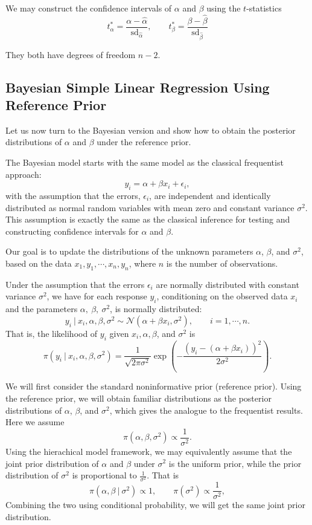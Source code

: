 \documentclass[]{book}
\theoremstyle{definition}
\theoremstyle{definition}
\theoremstyle{definition}
\theoremstyle{remark}
\begin{document}
We may construct the confidence intervals of \(\alpha\) and \(\beta\)
using the \(t\)-statistics \[ 
t_\alpha^\ast = \frac{\alpha - \hat{\alpha}}{\text{sd}_{\hat{\alpha}}},\qquad t_\beta^\ast = \frac{\beta-\hat{\beta}}{\text{sd}_{\hat{\beta}}} 
\]

They both have degrees of freedom \(n-2\).

\subsection{Bayesian Simple Linear Regression Using Reference
Prior}\label{bayesian-simple-linear-regression-using-reference-prior}

Let us now turn to the Bayesian version and show how to obtain the
posterior distributions of \(\alpha\) and \(\beta\) under the reference
prior.

The Bayesian model starts with the same model as the classical
frequentist approach: \[ y_i = \alpha + \beta x_i + \epsilon_i, \] with
the assumption that the errors, \(\epsilon_i\), are independent and
identically distributed as normal random variables with mean zero and
constant variance \(\sigma^2\). This assumption is exactly the same as
the classical inference for testing and constructing confidence
intervals for \(\alpha\) and \(\beta\).

Our goal is to update the distributions of the unknown parameters
\(\alpha\), \(\beta\), and \(\sigma^2\), based on the data
\(x_1, y_1, \cdots, x_n, y_n\), where \(n\) is the number of
observations.

Under the assumption that the errors \(\epsilon_i\) are normally
distributed with constant variance \(\sigma^2\), we have for each
response \(y_i\), conditioning on the observed data \(x_i\) and the
parameters \(\alpha,\ \beta,\ \sigma^2\), is normally distributed:
\[ y_i~|~x_i, \alpha, \beta,\sigma^2 \sim \mathcal{N}(\alpha + \beta x_i, \sigma^2),\qquad i = 1,\cdots, n. \]
That is, the likelihood of \(y_i\) given \(x_i, \alpha, \beta\), and
\(\sigma^2\) is
\[ \pi(y_i~|~x_i, \alpha, \beta, \sigma^2) = \frac{1}{\sqrt{2\pi\sigma^2}}\exp\left(-\frac{(y_i-(\alpha+\beta  x_i))^2}{2\sigma^2}\right). \]

We will first consider the standard noninformative prior (reference
prior). Using the reference prior, we will obtain familiar distributions
as the posterior distributions of \(\alpha\), \(\beta\), and
\(\sigma^2\), which gives the analogue to the frequentist results. Here
we assume \[ \pi(\alpha, \beta, \sigma^2)\propto \frac{1}{\sigma^2}. \]
Using the hierachical model framework, we may equivalently assume that
the joint prior distribution of \(\alpha\) and \(\beta\) under
\(\sigma^2\) is the uniform prior, while the prior distribution of
\(\sigma^2\) is proportional to \(\displaystyle \frac{1}{\sigma^2}\).
That is
\[ \pi(\alpha, \beta~|~\sigma^2) \propto 1, \qquad \pi(\sigma^2) \propto \frac{1}{\sigma^2}, \]
Combining the two using conditional probability, we will get the same
joint prior distribution.
\end{document}
